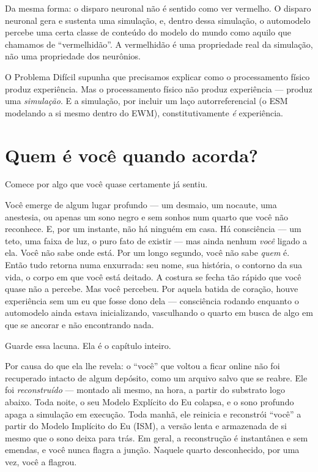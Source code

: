\documentclass[11pt, twoside, openright]{book}
\begin{document}
Da mesma forma: o disparo neuronal não é sentido como ver vermelho. O disparo neuronal gera e sustenta uma simulação, e, dentro dessa simulação, o automodelo percebe uma certa classe de conteúdo do modelo do mundo como aquilo que chamamos de ``vermelhidão''. A vermelhidão é uma propriedade real da simulação, não uma propriedade dos neurônios.

O Problema Difícil supunha que precisamos explicar como o processamento físico produz experiência. Mas o processamento físico não produz experiência --- produz uma \textit{simulação}. E a simulação, por incluir um laço autorreferencial (o ESM modelando a si mesmo dentro do EWM), constitutivamente \textit{é} experiência.

\section*{Quem é você quando acorda?}

Comece por algo que você quase certamente já sentiu.

Você emerge de algum lugar profundo --- um desmaio, um nocaute, uma anestesia, ou apenas um sono negro e sem sonhos num quarto que você não reconhece. E, por um instante, não há ninguém em casa. Há consciência --- um teto, uma faixa de luz, o puro fato de existir --- mas ainda nenhum \textit{você} ligado a ela. Você não sabe onde está. Por um longo segundo, você não sabe \textit{quem} é. Então tudo retorna numa enxurrada: seu nome, sua história, o contorno da sua vida, o corpo em que você está deitado. A costura se fecha tão rápido que você quase não a percebe. Mas você percebeu. Por aquela batida de coração, houve experiência sem um eu que fosse dono dela --- consciência rodando enquanto o automodelo ainda estava inicializando, vasculhando o quarto em busca de algo em que se ancorar e não encontrando nada.

Guarde essa lacuna. Ela é o capítulo inteiro.

Por causa do que ela lhe revela: o ``você'' que voltou a ficar online não foi recuperado intacto de algum depósito, como um arquivo salvo que se reabre. Ele foi \textit{reconstruído} --- montado ali mesmo, na hora, a partir do substrato logo abaixo. Toda noite, o seu Modelo Explícito do Eu colapsa, e o sono profundo apaga a simulação em execução. Toda manhã, ele reinicia e reconstrói ``você'' a partir do Modelo Implícito do Eu (ISM), a versão lenta e armazenada de si mesmo que o sono deixa para trás. Em geral, a reconstrução é instantânea e sem emendas, e você nunca flagra a junção. Naquele quarto desconhecido, por uma vez, você a flagrou.
\end{document}
